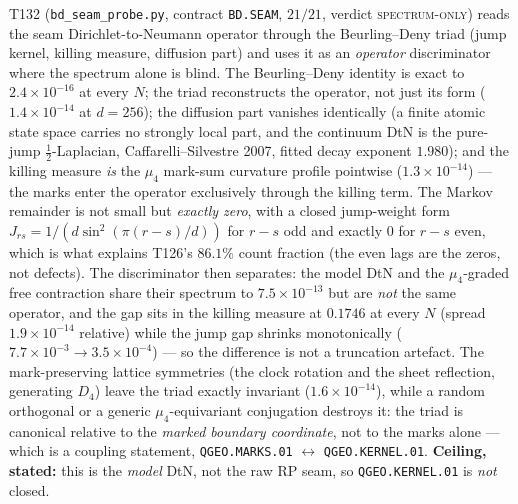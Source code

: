 \documentclass[11pt,a4paper]{article}
\begin{document}
\noindent T132 (\texttt{bd\_seam\_probe.py}, contract \texttt{BD.SEAM}, $21/21$, verdict
\textsc{spectrum-only}) reads the seam Dirichlet-to-Neumann operator through the
Beurling--Deny triad (jump kernel, killing measure, diffusion part) and uses it as an
\emph{operator} discriminator where the spectrum alone is blind. The Beurling--Deny identity
is exact to $2.4\times10^{-16}$ at every $N$; the triad reconstructs the operator, not just
its form ($1.4\times10^{-14}$ at $d=256$); the diffusion part vanishes identically (a finite
atomic state space carries no strongly local part, and the continuum DtN is the pure-jump
$\tfrac12$-Laplacian, Caffarelli--Silvestre 2007, fitted decay exponent $1.980$); and the
killing measure \emph{is} the $\mu_4$ mark-sum curvature profile pointwise
($1.3\times10^{-14}$) --- the marks enter the operator exclusively through the killing term.
The Markov remainder is not small but \emph{exactly zero}, with a closed jump-weight form
$J_{rs}=1/(d\sin^2(\pi(r-s)/d))$ for $r-s$ odd and exactly $0$ for $r-s$ even, which is what
explains T126's $86.1\%$ count fraction (the even lags are the zeros, not defects). The
discriminator then separates: the model DtN and the $\mu_4$-graded free contraction share
their spectrum to $7.5\times10^{-13}$ but are \emph{not} the same operator, and the gap sits
in the killing measure at $0.1746$ at every $N$ (spread $1.9\times10^{-14}$ relative) while
the jump gap shrinks monotonically ($7.7\times10^{-3}\to3.5\times10^{-4}$) --- so the
difference is not a truncation artefact. The mark-preserving lattice symmetries (the clock
rotation and the sheet reflection, generating $D_4$) leave the triad exactly invariant
($1.6\times10^{-14}$), while a random orthogonal or a generic $\mu_4$-equivariant
conjugation destroys it: the triad is canonical relative to the \emph{marked boundary
coordinate}, not to the marks alone --- which is a coupling statement,
\texttt{QGEO.MARKS.01} $\leftrightarrow$ \texttt{QGEO.KERNEL.01}. \textbf{Ceiling, stated:}
this is the \emph{model} DtN, not the raw RP seam, so \texttt{QGEO.KERNEL.01} is
\emph{not} closed.
\end{document}
